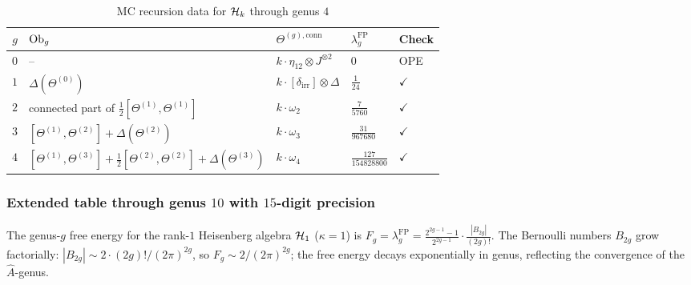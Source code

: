 \begin{table}[ht]
\centering
\caption{MC recursion data for $\mathcal{H}_k$ through genus $4$}
\begin{tabular}{cllll}
\hline
$g$ & $\mathrm{Ob}_g$ & $\Theta^{(g),\mathrm{conn}}$ & $\lambda_g^{\mathrm{FP}}$ & Check \\
\hline
$0$ & -- & $k \cdot \eta_{12} \otimes J^{\otimes 2}$ &
 $0$ & OPE \\
$1$ & $\Delta(\Theta^{(0)})$ &
 $k \cdot [\delta_{\mathrm{irr}}] \otimes \Delta$ &
 $\frac{1}{24}$ & $\checkmark$ \\
$2$ & connected part of $\frac{1}{2}[\Theta^{(1)},\Theta^{(1)}]$ &
 $k \cdot \omega_2$ &
 $\frac{7}{5760}$ & $\checkmark$ \\
$3$ & $[\Theta^{(1)},\Theta^{(2)}] + \Delta(\Theta^{(2)})$ &
 $k \cdot \omega_3$ &
 $\frac{31}{967680}$ & $\checkmark$ \\
$4$ & $[\Theta^{(1)},\Theta^{(3)}]
 + \frac{1}{2}[\Theta^{(2)},\Theta^{(2)}]
 + \Delta(\Theta^{(3)})$ &
 $k \cdot \omega_4$ &
 $\frac{127}{154828800}$ & $\checkmark$ \\
\hline
\end{tabular}
\end{table}

\subsubsection{Extended table through genus $10$ with $15$-digit precision}

The genus-$g$ free energy for the rank-$1$ Heisenberg algebra
$\mathcal{H}_1$ ($\kappa = 1$) is
$F_g = \lambda_g^{\mathrm{FP}}
= \frac{2^{2g-1}-1}{2^{2g-1}} \cdot \frac{|B_{2g}|}{(2g)!}$.
The Bernoulli numbers $B_{2g}$ grow factorially:
$|B_{2g}| \sim 2 \cdot (2g)! / (2\pi)^{2g}$, so
$F_g \sim 2/(2\pi)^{2g}$; the free energy decays
exponentially in genus, reflecting the convergence of
the $\hat{A}$-genus.

